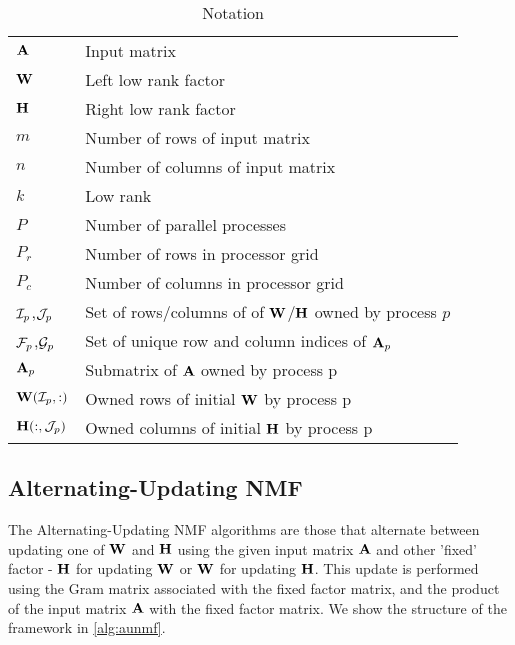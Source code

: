 \begin{table}%
\begin{center}
\begin{tabular}{|l|l|}
\hline
$\AA$ & Input matrix \\
$\WW$ & Left low rank factor \\
$\HH$ & Right low rank factor \\
$m$ & Number of rows of input matrix \\
$n$ & Number of columns of input matrix \\
$k$ & Low rank \\
$P$ & Number of parallel processes \\
$P_r$ & Number of rows in processor grid \\
$P_c$ & Number of columns in processor grid \\
$\Ip$,$\Jp$ & Set of rows/columns of of $\Wm$/$\Hm$ owned by process $p$  \\
$\Fp$,$\Gp$ & Set of unique row and column indices of $\Amp$ \\
$\Amp$ & Submatrix of $\Am$ owned by process p \\
$\Wm(\Ip,:)$ & Owned rows of initial $\Wm$ by process p \\
$\Hm(:,\Jp)$ & Owned columns of initial $\Hm$ by process p\\

\hline
\end{tabular}
\end{center}
\caption{Notation}
\label{tab:notation}
\end{table}%

\subsection{Alternating-Updating NMF}

The Alternating-Updating NMF algorithms are those that alternate between updating one of $\WW$ and $\HH$ using the given input matrix $\AA$ and other 'fixed' factor - $\HH$ for updating $\WW$ or $\WW$ for updating $\HH$.
This update is performed using the Gram matrix associated with the fixed factor matrix, and the product of the input matrix $\AA$ with the fixed factor matrix.
We show the structure of the framework in \cref{alg:aunmf}. 


